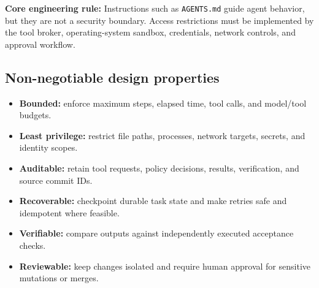 \documentclass[10pt,letterpaper]{article}
\newcommand{\term}[1]{\textbf{\color{DeepBlue}#1}}
\newcommand{\code}[1]{\texttt{#1}}
\begin{document}
\begin{principlebox}
\textbf{Core engineering rule:} Instructions such as \code{AGENTS.md} guide agent behavior, but they are not a security boundary. Access restrictions must be implemented by the tool broker, operating-system sandbox, credentials, network controls, and approval workflow.
\end{principlebox}

\subsection{Non-negotiable design properties}
\begin{itemize}
  \item \term{Bounded:} enforce maximum steps, elapsed time, tool calls, and model/tool budgets.
  \item \term{Least privilege:} restrict file paths, processes, network targets, secrets, and identity scopes.
  \item \term{Auditable:} retain tool requests, policy decisions, results, verification, and source commit IDs.
  \item \term{Recoverable:} checkpoint durable task state and make retries safe and idempotent where feasible.
  \item \term{Verifiable:} compare outputs against independently executed acceptance checks.
  \item \term{Reviewable:} keep changes isolated and require human approval for sensitive mutations or merges.
\end{itemize}

\end{document}
